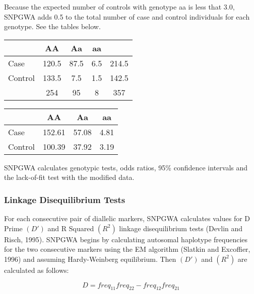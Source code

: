 \begin{enumerate}
Because the expected number of controls with genotype aa is less that 3.0,
SNPGWA adds 0.5 to the total number of case and control individuals for each
genotype.  See the tables below.

\begin{center}
  \begin{tabular}{lcccc}
    \hline
    {}     & \textbf{AA} & \textbf{Aa} & \textbf{aa} & {} \\
    \hline
    Case    & 120.5 & 87.5 & 6.5 & 214.5 \\
    Control & 133.5 &  7.5 & 1.5 & 142.5 \\
    {}    & 254   & 95   & 8 & 357 \\
    \hline
  \end{tabular}
\end{center}

\begin{center}
  \begin{tabular}{lccc}
    \hline
    {}     & \textbf{AA} & \textbf{Aa} & \textbf{aa}  \\
    \hline
    Case    & 152.61      & 57.08       & 4.81 \\
    Control & 100.39      & 37.92       & 3.19 \\
    \hline
  \end{tabular}
\end{center}

SNPGWA calculates genotypic tests, odds ratios, 95\% confidence intervals and
the lack-of-fit test with the modified data.

\end{enumerate}

\subsubsection{Linkage Disequilibrium Tests}
\label{sec:linkage-dis}
For each consecutive pair of diallelic markers, SNPGWA calculates values for D
Prime $\left(D'\right)$ and R Squared $\left(R^2\right)$ linkage disequilibrium
tests (Devlin and Risch, 1995).  SNPGWA begins by calculating autosomal
haplotype frequencies for the two consecutive markers using the EM algorithm
(Slatkin and Excoffier, 1996) and assuming Hardy-Weinberg equilibrium.  Then
$\left(D'\right)$ and $\left(R^2\right)$ are calculated as follows:

\begin{equation*}
 D = freq_{11}freq_{22} - freq_{12}freq_{21}
\end{equation*}

